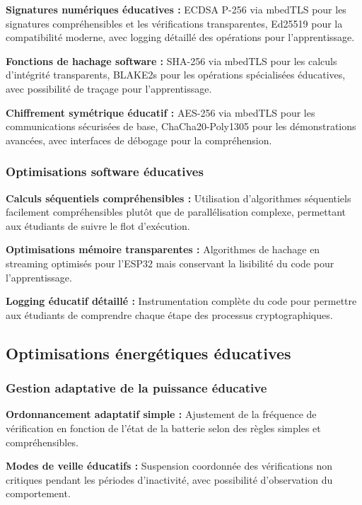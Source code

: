\begin{algorithm}
\textbf{Signatures numériques éducatives :} ECDSA P-256 via mbedTLS pour les signatures compréhensibles et les vérifications transparentes, Ed25519 pour la compatibilité moderne, avec logging détaillé des opérations pour l'apprentissage.

\textbf{Fonctions de hachage software :} SHA-256 via mbedTLS pour les calculs d'intégrité transparents, BLAKE2s pour les opérations spécialisées éducatives, avec possibilité de traçage pour l'apprentissage.

\textbf{Chiffrement symétrique éducatif :} AES-256 via mbedTLS pour les communications sécurisées de base, ChaCha20-Poly1305 pour les démonstrations avancées, avec interfaces de débogage pour la compréhension.

\subsubsection{Optimisations software éducatives}

\textbf{Calculs séquentiels compréhensibles :} Utilisation d'algorithmes séquentiels facilement compréhensibles plutôt que de parallélisation complexe, permettant aux étudiants de suivre le flot d'exécution.

\textbf{Optimisations mémoire transparentes :} Algorithmes de hachage en streaming optimisés pour l'ESP32 mais conservant la lisibilité du code pour l'apprentissage.

\textbf{Logging éducatif détaillé :} Instrumentation complète du code pour permettre aux étudiants de comprendre chaque étape des processus cryptographiques.

\subsection{Optimisations énergétiques éducatives}

\subsubsection{Gestion adaptative de la puissance éducative}

\textbf{Ordonnancement adaptatif simple :} Ajustement de la fréquence de vérification en fonction de l'état de la batterie selon des règles simples et compréhensibles.

\textbf{Modes de veille éducatifs :} Suspension coordonnée des vérifications non critiques pendant les périodes d'inactivité, avec possibilité d'observation du comportement.


\end{algorithm}
